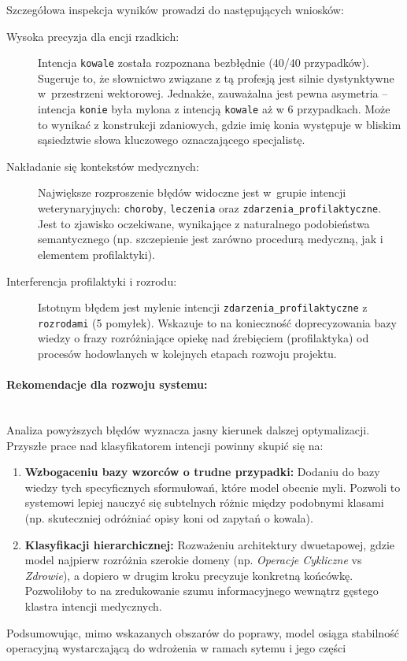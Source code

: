 Szczegółowa inspekcja wyników prowadzi do następujących wniosków:

\begin{description}
	\item[Wysoka precyzja dla encji rzadkich:] Intencja \texttt{kowale} została rozpoznana bezbłędnie (40/40 przypadków). Sugeruje to, że słownictwo związane z tą profesją jest silnie dystynktywne w~przestrzeni wektorowej. Jednakże, zauważalna jest pewna asymetria – intencja \texttt{konie} była mylona z intencją \texttt{kowale} aż w 6 przypadkach. Może to wynikać z konstrukcji zdaniowych, gdzie imię konia występuje w bliskim sąsiedztwie słowa kluczowego oznaczającego specjalistę.
    
	\item[Nakładanie się kontekstów medycznych:] Największe rozproszenie błędów widoczne jest w~grupie intencji weterynaryjnych: \texttt{choroby}, \texttt{leczenia} oraz \texttt{zdarzenia\_profilaktyczne}. Jest to zjawisko oczekiwane, wynikające z naturalnego podobieństwa semantycznego (np. szczepienie jest zarówno procedurą medyczną, jak i elementem profilaktyki).
    
	\item[Interferencja profilaktyki i rozrodu:] Istotnym błędem jest mylenie intencji \texttt{zdarzenia\_\allowbreak{}profi\allowbreak{}laktyczne} z \texttt{rozrodami} (5 pomyłek). Wskazuje to na konieczność doprecyzowania bazy wiedzy o frazy rozróżniające opiekę nad źrebięciem (profilaktyka) od procesów hodowlanych w kolejnych etapach rozwoju projektu.
\end{description}

\paragraph{Rekomendacje dla rozwoju systemu:}~\\
Analiza powyższych błędów wyznacza jasny kierunek dalszej optymalizacji. Przyszłe prace nad klasyfikatorem intencji powinny skupić się na:
\begin{enumerate}
    \item \textbf{Wzbogaceniu bazy wzorców o trudne przypadki:} Dodaniu do bazy wiedzy tych specyficznych sformułowań, które model obecnie myli. Pozwoli to systemowi lepiej nauczyć się subtelnych różnic między podobnymi klasami (np. skuteczniej odróżniać opisy koni od zapytań o kowala).
    \item \textbf{Klasyfikacji hierarchicznej:} Rozważeniu architektury dwuetapowej, gdzie model najpierw rozróżnia szerokie domeny (np. \textit{Operacje Cykliczne} vs \textit{Zdrowie}), a dopiero w drugim kroku precyzuje konkretną końcówkę. Pozwoliłoby to na zredukowanie szumu informacyjnego wewnątrz gęstego klastra intencji medycznych.
\end{enumerate}

Podsumowując, mimo wskazanych obszarów do poprawy, model osiąga stabilność operacyjną wystarczającą do wdrożenia w ramach sytemu  i jego części  
